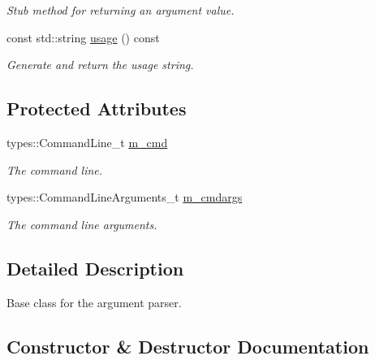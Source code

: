 \begin{DoxyCompactItemize}
\begin{DoxyCompactList}\small\item\em Stub method for returning an argument value. \end{DoxyCompactList}\item 
const std\+::string \hyperlink{classcppargparse_1_1parser_1_1ArgumentParserBase_af99c2847a2cd19b1444dcb9ab2fb8103}{usage} () const
\begin{DoxyCompactList}\small\item\em Generate and return the usage string. \end{DoxyCompactList}\end{DoxyCompactItemize}
\subsection*{Protected Attributes}
\begin{DoxyCompactItemize}
\item 
\mbox{\label{classcppargparse_1_1parser_1_1ArgumentParserBase_ab61aac285e831ef24598191816bed84d}} 
types\+::\+Command\+Line\+\_\+t \hyperlink{classcppargparse_1_1parser_1_1ArgumentParserBase_ab61aac285e831ef24598191816bed84d}{m\+\_\+cmd}
\begin{DoxyCompactList}\small\item\em The command line. \end{DoxyCompactList}\item 
\mbox{\label{classcppargparse_1_1parser_1_1ArgumentParserBase_ac6fd162f8dfee569bb281ae5ef576d38}} 
types\+::\+Command\+Line\+Arguments\+\_\+t \hyperlink{classcppargparse_1_1parser_1_1ArgumentParserBase_ac6fd162f8dfee569bb281ae5ef576d38}{m\+\_\+cmdargs}
\begin{DoxyCompactList}\small\item\em The command line arguments. \end{DoxyCompactList}\end{DoxyCompactItemize}


\subsection{Detailed Description}
Base class for the argument parser. 

\subsection{Constructor \& Destructor Documentation}
\mbox{\label{classcppargparse_1_1parser_1_1ArgumentParserBase_a91c5c101e21966fb8c04c094b04b8ba3}} 
